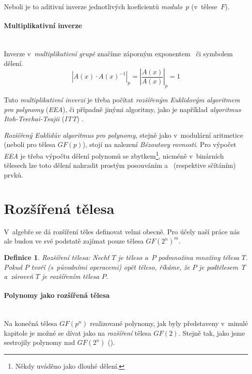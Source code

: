 \documentclass[thesis=M,czech,hidelinks]{FITthesis}[2012/06/26]
\newcommand{\0}{{\textcolor[gray]{0.75}{0}}}
\newtheorem{definice}{Definice}
\begin{document}
Neboli je to aditivní inverze jednotlivých koeficientů \emph{modulo}~$p$
(v~tělese~$F$).


\paragraph{Multiplikativní inverze} \hfil \\
Inverze v~\emph{multiplikativní grupě} značíme záporným exponentem~
či symbolem dělení.
$$
    \left| A(x) \cdot A(x)^{-1} \right|_p = \left| \frac{A(x)}{A(x)} \right|_p = 1
$$

Tuto \emph{multiplikativní inverzi} je třeba počítat \emph{rozšířeným Euklidovým
algoritmem pro polynomy} (\emph{EEA}), či případně jinými algoritmy, jako je
například \emph{algoritmus Itoh-Teechai-Tsujii} (\emph{ITT}) \cite{FIT_BHW,ITT}.

\emph{Rozšířený Euklidův algoritmus} \emph{pro polynomy}, stejně jako
v~modulární aritmetice (neboli pro tělesa $GF(p)$), stojí na nalezení
\emph{Bézoutovy rovnosti}. Pro výpočet \emph{EEA} je třeba výpočtu dělení
polynomů se zbytkem\footnote{
    Někdy uváděno jako dlouhé dělení.
}, nicméně v~binárních tělesech lze toto dělení nahradit prostým posouváním
a~ (respektive sčítáním) prvků.



\section{Rozšířená tělesa}
V~algebře se dá rozšíření těles definovat velmi obecně. Pro účely naší práce
nás ale budou ve své podstatě zajímat pouze tělesa $GF(2^n)^m$.

\begin{definice}{Rozšíření tělesa:}
    Nechť $T$ je těleso a~$P$ podmnožina množiny tělesa $T$. Pokud $P$ tvoří
    (s~původními operacemi) opět těleso, říkáme, že $P$ je \emph{podtělesem}~$T$
    a~zároveň $T$ je \emph{rozšířením} tělesa $P$.
\end{definice}


\paragraph{Polynomy jako rozšířená tělesa} \hfil \\
Na konečná tělesa $GF(p^n)$ realizované polynomy, jak byly představeny v~minulé
kapitole je možné se dívat jako na \emph{rozšíření} tělesa $GF(2)$. Stejně tak,
jako jsme sestrojily polynomy nad $GF(2^n)$ ().
\end{document}
